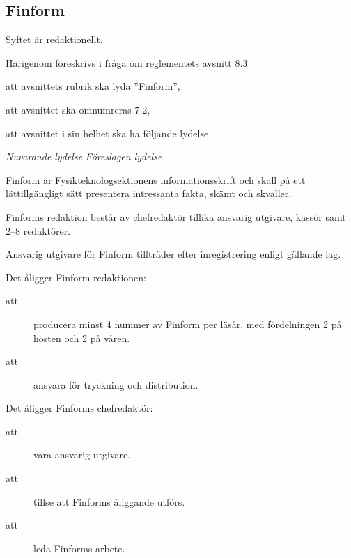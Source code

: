 \documentclass{article}
\newenvironment{lydelse}
    {\begin{paracol}{2}%
        \emph{Nuvarande lydelse}%
        \switchcolumn%
        \emph{Föreslagen lydelse}%
    \end{paracol}%
    \begin{enumerate}[label=\thesubsection.\arabic*]%
    \begin{paracol}{2}%
    }{\end{paracol}\end{enumerate}}
\begin{document}
\subsection{Finform}
Syftet är redaktionellt.

Härigenom föreskrivs i fråga om reglementets avsnitt 8.3

\begin{dels}
    \item att avsnittets rubrik ska lyda ''Finform'',
    \item att avsnittet ska omnumreras 7.2,
    \item att avsnittet i sin helhet ska ha följande lydelse.
\end{dels}

\begin{lydelse}
    \setcounter{section}{8}
    \setcounter{subsection}{3}
    
    
    \item Finform är Fysikteknologsektionens informationsskrift och skall på ett lättillgängligt sätt presentera intressanta fakta, skämt och skvaller. 
    
    \item Finforms redaktion består av chefredaktör tillika ansvarig utgivare, kassör samt 2--8 redaktörer.
    
    \vspace{7.1em}
    \item Ansvarig utgivare för Finform tillträder efter inregistrering enligt gällande lag.

    \item Det åligger Finform-redaktionen:
	\begin{description}
		\item[att] producera minst 4 nummer av Finform per läsår, med fördelningen 2 på hösten och 2 på våren.
		\item[att] ansvara för tryckning och distribution.
	\end{description}
    
    \vspace{2.5em}
    \item Det åligger Finforms chefredaktör:
	\begin{description}
		\item[att] vara ansvarig utgivare.
		\item[att] tillse att Finforms åliggande utförs.
		\item[att] leda Finforms arbete.
	\end{description}
	


\end{lydelse}
\end{document}
